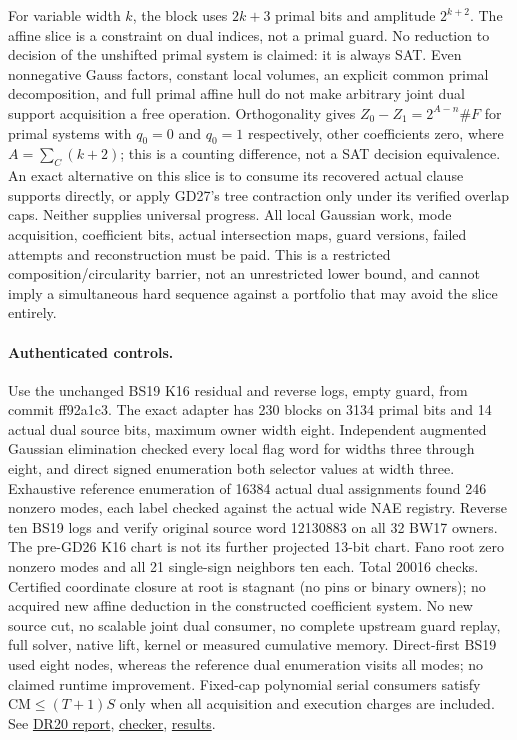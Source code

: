 \documentclass[11pt]{article}
\begin{document}
For variable width $k$, the block uses $2k+3$ primal bits and amplitude $2^{k+2}$. The affine slice is a constraint on dual indices, not a primal guard. No reduction to decision of the unshifted primal system is claimed: it is always SAT. Even nonnegative Gauss factors, constant local volumes, an explicit common primal decomposition, and full primal affine hull do not make arbitrary joint dual support acquisition a free operation. Orthogonality gives $Z_0-Z_1=2^{A-n}\#F$ for primal systems with $q_0=0$ and $q_0=1$ respectively, other coefficients zero, where $A=\sum_C(k+2)$; this is a counting difference, not a SAT decision equivalence. An exact alternative on this slice is to consume its recovered actual clause supports directly, or apply GD27's tree contraction only under its verified overlap caps. Neither supplies universal progress. All local Gaussian work, mode acquisition, coefficient bits, actual intersection maps, guard versions, failed attempts and reconstruction must be paid. This is a restricted composition/circularity barrier, not an unrestricted lower bound, and cannot imply a simultaneous hard sequence against a portfolio that may avoid the slice entirely.
\paragraph{Authenticated controls.}
Use the unchanged BS19 K16 residual and reverse logs, empty guard, from commit ff92a1c3. The exact adapter has 230 blocks on 3134 primal bits and 14 actual dual source bits, maximum owner width eight. Independent augmented Gaussian elimination checked every local flag word for widths three through eight, and direct signed enumeration both selector values at width three. Exhaustive reference enumeration of 16384 actual dual assignments found 246 nonzero modes, each label checked against the actual wide NAE registry. Reverse ten BS19 logs and verify original source word 12130883 on all 32 BW17 owners. The pre-GD26 K16 chart is not its further projected 13-bit chart. Fano root zero nonzero modes and all 21 single-sign neighbors ten each. Total 20016 checks. Certified coordinate closure at root is stagnant (no pins or binary owners); no acquired new affine deduction in the constructed coefficient system. No new source cut, no scalable joint dual consumer, no complete upstream guard replay, full solver, native lift, kernel or measured cumulative memory. Direct-first BS19 used eight nodes, whereas the reference dual enumeration visits all modes; no claimed runtime improvement. Fixed-cap polynomial serial consumers satisfy $\mathrm{CM}\le(T+1)S$ only when all acquisition and execution charges are included. See \href{https://github.com/j15marti/pnp/commit/ed4e553d636fd4d1399600abb19c4dac10081a04}{DR20 report}, \href{https://github.com/j15marti/pnp/commit/266ea7a8b1a167c1ac03f9c0d841224240ec6f04}{checker}, \href{https://github.com/j15marti/pnp/commit/691422636c46191159a930ac4430e0e11a0a9f79}{results}.
\end{document}
